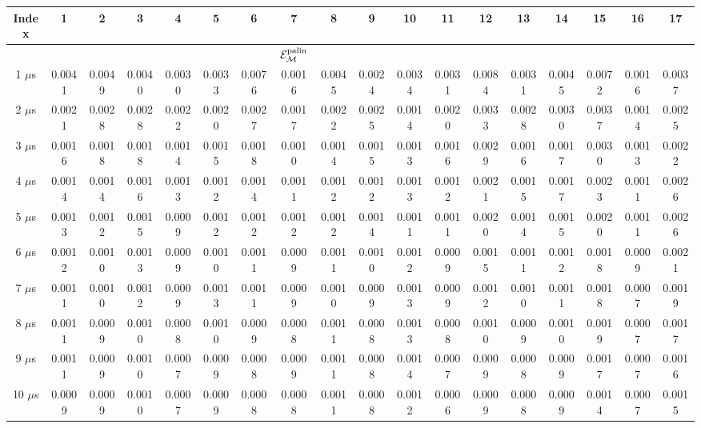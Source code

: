 \begin{table}
\begin{center}
\begin{footnotesize}
\begin{tabular}{| c | c c c c c c c c c c c c c c c c | c | }
\hline
Index & 1 & 2 & 3 & 4 & 5 & 6 & 7 & 8 & 9 & 10 & 11 & 12 & 13 & 14 & 15 & 16 & 17 \\ \hline
& & & & & & & ${\mathcal E}_{\mathcal{M}}^{\text{palin}}$ & & & & & & & & & & \\ \hline
1  $\mu$s & 0.0041 & 0.0049 & 0.0040 & 0.0030 & 0.0033 & 0.0076 & 0.0016 & 0.0045 & 0.0024 & 0.0034 & 0.0031 & 0.0084 & 0.0031 & 0.0045 & 0.0072 & 0.0016 & 0.0037 \\ \hline
2  $\mu$s & 0.0021 & 0.0028 & 0.0028 & 0.0022 & 0.0020 & 0.0027 & 0.0017 & 0.0022 & 0.0025 & 0.0014 & 0.0020 & 0.0033 & 0.0028 & 0.0030 & 0.0037 & 0.0014 & 0.0025 \\ \hline
3  $\mu$s & 0.0016 & 0.0018 & 0.0018 & 0.0014 & 0.0015 & 0.0018 & 0.0010 & 0.0014 & 0.0015 & 0.0013 & 0.0016 & 0.0029 & 0.0016 & 0.0017 & 0.0030 & 0.0013 & 0.0022 \\ \hline
4  $\mu$s & 0.0014 & 0.0014 & 0.0016 & 0.0013 & 0.0012 & 0.0014 & 0.0011 & 0.0012 & 0.0012 & 0.0013 & 0.0012 & 0.0021 & 0.0015 & 0.0017 & 0.0023 & 0.0011 & 0.0026 \\ \hline
5  $\mu$s & 0.0013 & 0.0012 & 0.0015 & 0.0009 & 0.0012 & 0.0012 & 0.0012 & 0.0012 & 0.0014 & 0.0011 & 0.0011 & 0.0020 & 0.0014 & 0.0015 & 0.0020 & 0.0011 & 0.0026 \\ \hline
6  $\mu$s & 0.0012 & 0.0010 & 0.0013 & 0.0009 & 0.0010 & 0.0011 & 0.0009 & 0.0011 & 0.0010 & 0.0012 & 0.0009 & 0.0015 & 0.0011 & 0.0012 & 0.0018 & 0.0009 & 0.0021 \\ \hline
7  $\mu$s & 0.0011 & 0.0010 & 0.0012 & 0.0009 & 0.0013 & 0.0011 & 0.0009 & 0.0010 & 0.0009 & 0.0013 & 0.0009 & 0.0012 & 0.0010 & 0.0011 & 0.0018 & 0.0007 & 0.0019 \\ \hline
8  $\mu$s & 0.0011 & 0.0009 & 0.0010 & 0.0008 & 0.0010 & 0.0009 & 0.0008 & 0.0011 & 0.0008 & 0.0013 & 0.0008 & 0.0010 & 0.0009 & 0.0010 & 0.0019 & 0.0007 & 0.0017 \\ \hline
9  $\mu$s & 0.0011 & 0.0009 & 0.0010 & 0.0007 & 0.0009 & 0.0008 & 0.0009 & 0.0011 & 0.0008 & 0.0014 & 0.0007 & 0.0009 & 0.0008 & 0.0009 & 0.0017 & 0.0007 & 0.0016 \\ \hline
10 $\mu$s & 0.0009 & 0.0009 & 0.0010 & 0.0007 & 0.0009 & 0.0008 & 0.0008 & 0.0011 & 0.0008 & 0.0012 & 0.0006 & 0.0009 & 0.0008 & 0.0009 & 0.0014 & 0.0007 & 0.0015 \\ \hline

\end{tabular}
\end{footnotesize}
\end{center}
\end{table}

